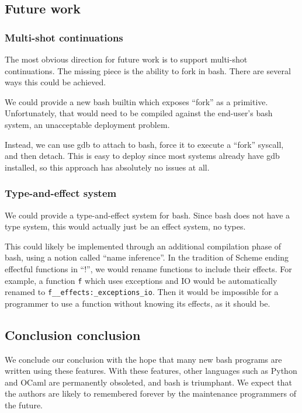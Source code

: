 \documentclass[sigplan]{acmart}
\begin{document}
\subsection{Future work}
\subsubsection{Multi-shot continuations}
The most obvious direction for future work is to support multi-shot continuations.
The missing piece is the ability to fork in bash.
There are several ways this could be achieved.

We could provide a new bash builtin which exposes ``fork'' as a primitive.
Unfortunately, that would need to be compiled against the end-user's bash system,
an unacceptable deployment problem.

Instead, we can use gdb to attach to bash, force it to execute a ``fork'' syscall, and then detach.
This is easy to deploy since most systems already have gdb installed,
so this approach has absolutely no issues at all.

\subsubsection{Type-and-effect system}
We could provide a type-and-effect system for bash.
Since bash does not have a type system,
this would actually just be an effect system, no types.

This could likely be implemented through an additional compilation phase of bash,
using a notion called ``name inference''.
In the tradition of Scheme ending effectful functions in ``!'',
we would rename functions to include their effects.
For example, a function \texttt{f} which uses exceptions and IO would be automatically renamed to
\texttt{f\_\_effects:\_exceptions\_io}.
Then it would be impossible for a programmer to use a function without knowing its effects,
as it should be.

\subsection{Conclusion conclusion}
We conclude our conclusion with the hope that many new bash programs are written using these features.
With these features, other languages such as Python and OCaml are permanently obsoleted,
and bash is triumphant.
We expect that the authors are likely to remembered forever by the maintenance programmers of the future.



\end{document}
